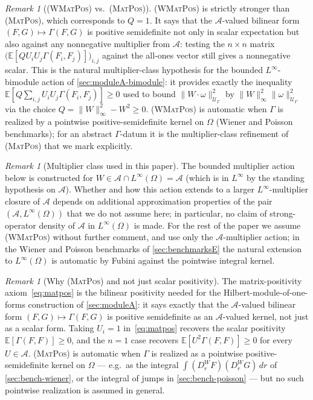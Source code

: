 \documentclass[11pt,reqno]{amsart}
\theoremstyle{plain}
\theoremstyle{definition}
\theoremstyle{remark}
\newtheorem{remark}[theorem]{Remark}
\newcommand{\E}{\mathbb{E}}
\newcommand{\cA}{\mathcal A}
\newcommand{\cU}{\mathcal U}
\begin{document}
\begin{remark}[\textsc{(WMatPos)} vs.\ \textsc{(MatPos)}]\label{rem:wmatpos}
\textsc{(WMatPos)} is strictly stronger than \textsc{(MatPos)},
which corresponds to $Q=1$. It says that the $\cA$-valued
bilinear form $(F,G)\mapsto\Gamma(F,G)$ is positive semidefinite
not only in scalar expectation but also against any nonnegative
multiplier from $\cA$: testing the $n\times n$ matrix
$\bigl(\E[Q U_{i}U_{j}\Gamma(F_{i},F_{j})]\bigr)_{i,j}$ against
the all-ones vector still gives a nonnegative scalar. This is
the natural multiplier-class hypothesis for the bounded
$L^{\infty}$-bimodule action of \cref{sec:moduleA-bimodule}: it
provides exactly the inequality
$\E[Q\sum_{i,j}U_{i}U_{j}\Gamma(F_{i},F_{j})]\ge 0$ used to bound
$\|W\cdot\omega\|_{\cU_{\Gamma}}^{2}$ by
$\|W\|_{\infty}^{2}\|\omega\|_{\cU_{\Gamma}}^{2}$ via the choice
$Q=\|W\|_{\infty}^{2}-W^{2}\ge 0$. \textsc{(WMatPos)} is
automatic when $\Gamma$ is realized by a pointwise
positive-semidefinite kernel on $\Omega$ (Wiener and Poisson
benchmarks); for an abstract $\Gamma$-datum it is the
multiplier-class refinement of \textsc{(MatPos)} that we mark
explicitly.
\end{remark}

\begin{remark}[Multiplier class used in this paper]\label{rem:wmatpos-multiplier-class}
The bounded multiplier action below is constructed for
$W\in\cA\cap L^{\infty}(\Omega)=\cA$ (which is in $L^{\infty}$
by the standing hypothesis on $\cA$). Whether and how this
action extends to a larger $L^{\infty}$-multiplier closure of
$\cA$ depends on additional approximation properties of the
pair $(\cA,L^{\infty}(\Omega))$ that we do not assume here; in
particular, no claim of strong-operator density of $\cA$ in
$L^{\infty}(\Omega)$ is made. For the rest of the paper we
assume \textsc{(WMatPos)} without further comment, and use only
the $\cA$-multiplier action; in the Wiener and Poisson
benchmarks of \cref{sec:benchmarksE} the natural extension to
$L^{\infty}(\Omega)$ is automatic by Fubini against the
pointwise integral kernel.
\end{remark}

\begin{remark}[Why \textsc{(MatPos)} and not just scalar positivity]\label{rem:matpos-vs-pos2}
The matrix-positivity axiom~\eqref{eq:matpos} is the bilinear
positivity needed for the Hilbert-module-of-one-forms
construction of \cref{sec:moduleA}: it says exactly that the
$\cA$-valued bilinear form $(F,G)\mapsto\Gamma(F,G)$ is positive
semidefinite as an $\cA$-valued kernel, not just as a scalar
form. Taking $U_{i}=1$ in~\eqref{eq:matpos} recovers the scalar
positivity $\E[\Gamma(F,F)]\ge 0$, and the $n=1$ case recovers
$\E[U^{2}\Gamma(F,F)]\ge 0$ for every $U\in\cA$.
\textsc{(MatPos)} is automatic when $\Gamma$ is realized as a
pointwise positive-semidefinite kernel on $\Omega$ --- e.g.\ as
the integral $\int(D_{r}^{W}F)(D_{r}^{W}G)\,dr$ of
\cref{sec:bench-wiener}, or the integral of jumps in
\cref{sec:bench-poisson} --- but no such pointwise realization
is assumed in general.
\end{remark}
\end{document}
